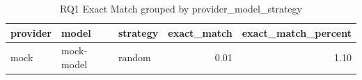 \begin{table}
\caption{RQ1 Exact Match grouped by provider_model_strategy}
\label{tab:rq1_provider_model_strategy}
\begin{tabular}{lllrr}
\toprule
provider & model & strategy & exact_match & exact_match_percent \\
\midrule
mock & mock-model & random & 0.01 & 1.10 \\
\bottomrule
\end{tabular}
\end{table}
